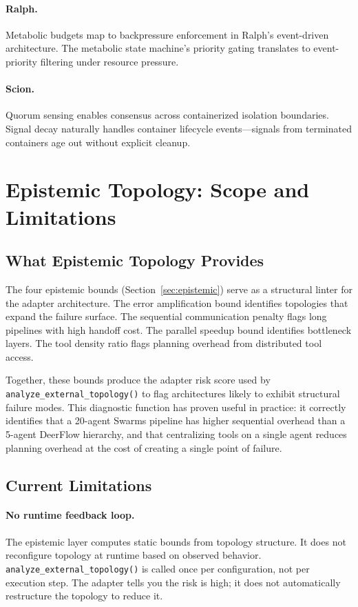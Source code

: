 \documentclass[11pt]{article}
\begin{document}
\paragraph{Ralph.}
Metabolic budgets map to backpressure enforcement in Ralph's
event-driven architecture.  The metabolic state machine's priority
gating translates to event-priority filtering under resource pressure.

\paragraph{Scion.}
Quorum sensing enables consensus across containerized isolation
boundaries.  Signal decay naturally handles container lifecycle
events---signals from terminated containers age out without explicit
cleanup.

\section{Epistemic Topology: Scope and Limitations}\label{sec:topo-limits}

\subsection{What Epistemic Topology Provides}

The four epistemic bounds (Section~\ref{sec:epistemic}) serve as a
structural linter for the adapter architecture.  The error amplification
bound identifies topologies that expand the failure surface.  The
sequential communication penalty flags long pipelines with high handoff
cost.  The parallel speedup bound identifies bottleneck layers.  The
tool density ratio flags planning overhead from distributed tool access.

Together, these bounds produce the adapter risk score used by
\texttt{analyze\_external\_topology()} to flag architectures likely to
exhibit structural failure modes.  This diagnostic function has proven
useful in practice: it correctly identifies that a 20-agent Swarms
pipeline has higher sequential overhead than a 5-agent DeerFlow
hierarchy, and that centralizing tools on a single agent reduces
planning overhead at the cost of creating a single point of failure.

\subsection{Current Limitations}

\paragraph{No runtime feedback loop.}
The epistemic layer computes static bounds from topology structure.  It
does not reconfigure topology at runtime based on observed behavior.
\texttt{analyze\_external\_topology()} is called once per configuration,
not per execution step.  The adapter tells you the risk is high; it does
not automatically restructure the topology to reduce it.
\end{document}
